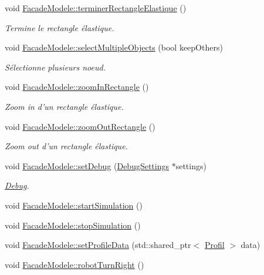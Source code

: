 \begin{DoxyCompactItemize}
void \hyperlink{group__inf2990_ga1c99d4d88f05b70a20b36b51c07f31cf}{Facade\-Modele\-::terminer\-Rectangle\-Elastique} ()
\begin{DoxyCompactList}\small\item\em Termine le rectangle élastique. \end{DoxyCompactList}\item 
void \hyperlink{group__inf2990_ga7cbdab19081ab5e385cff2862e0642cd}{Facade\-Modele\-::select\-Multiple\-Objects} (bool keep\-Others)
\begin{DoxyCompactList}\small\item\em Sélectionne plusieurs noeud. \end{DoxyCompactList}\item 
void \hyperlink{group__inf2990_ga10c88f159ad8d8ff9b17927d7ca50a0e}{Facade\-Modele\-::zoom\-In\-Rectangle} ()
\begin{DoxyCompactList}\small\item\em Zoom in d'un rectangle élastique. \end{DoxyCompactList}\item 
void \hyperlink{group__inf2990_ga9b2a60b7b9392f6284e2fb7560e9c7f8}{Facade\-Modele\-::zoom\-Out\-Rectangle} ()
\begin{DoxyCompactList}\small\item\em Zoom out d'un rectangle élastique. \end{DoxyCompactList}\item 
void \hyperlink{group__inf2990_ga71d55e6afad08a095a1abe96d93b44d4}{Facade\-Modele\-::set\-Debug} (\hyperlink{struct_debug_settings}{Debug\-Settings} $\ast$settings)
\begin{DoxyCompactList}\small\item\em \hyperlink{class_debug}{Debug}. \end{DoxyCompactList}\item 
void \hyperlink{group__inf2990_ga740a421946d07eead14da960843da348}{Facade\-Modele\-::start\-Simulation} ()
\item 
void \hyperlink{group__inf2990_gab38182bf38d343b899e9e9ee533529d9}{Facade\-Modele\-::stop\-Simulation} ()
\item 
void \hyperlink{group__inf2990_ga5c5c0316590a27089e3d97b0d4b65c62}{Facade\-Modele\-::set\-Profile\-Data} (std\-::shared\-\_\-ptr$<$ \hyperlink{struct_profil}{Profil} $>$ data)
\item 
void \hyperlink{group__inf2990_gad7ed7270a0485181ddcce168ef035db9}{Facade\-Modele\-::robot\-Turn\-Right} ()
\item 

\end{DoxyCompactItemize}
